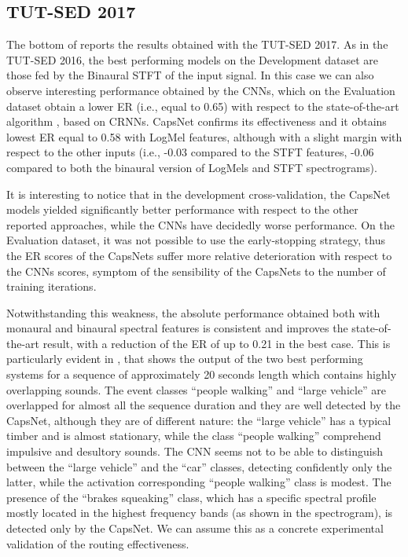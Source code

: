 \subsection{TUT-SED 2017}

The bottom of  reports the results obtained with the TUT-SED 2017. As in the TUT-SED 2016, the best performing models on the Development dataset are those fed by the Binaural STFT of the input signal. In this case we can also observe interesting performance obtained by the CNNs, which on the Evaluation dataset obtain a lower ER (i.e., equal to 0.65) with respect to the state-of-the-art algorithm \cite{adavanne2017report}, based on CRNNs. CapsNet confirms its effectiveness and it obtains lowest ER equal to 0.58 with LogMel features, although with a slight margin with respect to the other inputs (i.e., -0.03 compared to the STFT features, -0.06 compared to both the binaural version of LogMels and STFT spectrograms).

It is interesting to notice that in the development cross-validation, the CapsNet models yielded significantly better performance with respect to the other reported approaches, while the CNNs have decidedly worse performance. On the Evaluation dataset, it was not possible to use the early-stopping strategy, thus the ER scores of the CapsNets suffer more relative deterioration with respect to the CNNs scores, symptom of the sensibility of the CapsNets to the number of training iterations.

Notwithstanding this weakness, the absolute performance obtained both with monaural and binaural spectral features is consistent and improves the state-of-the-art result, with a reduction of the ER of up to 0.21 in the best case. This is particularly evident in , that shows the output of the two best performing systems for a sequence of approximately 20 seconds length which contains highly overlapping sounds. The event classes ``people walking'' and ``large vehicle'' are overlapped for almost all the sequence duration and they are well detected by the CapsNet, although they are of different nature: the ``large vehicle'' has a typical timber and is almost stationary, while the class ``people walking'' comprehend impulsive and desultory sounds. The CNN seems not to be able to distinguish between the ``large vehicle'' and the ``car'' classes, detecting confidently only the latter, while the activation corresponding ``people walking'' class is modest. The presence of the ``brakes squeaking'' class, which has a specific spectral profile mostly located in the highest frequency bands (as shown in the spectrogram), is detected only by the CapsNet. We can assume this as a concrete experimental validation of the routing effectiveness.

